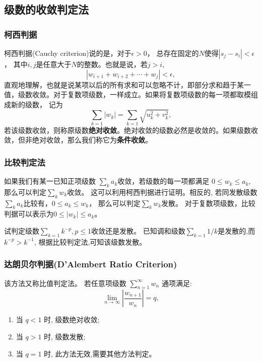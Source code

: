 \subsection{级数的收敛判定法}

\subsubsection{柯西判据}
柯西判据(Cauchy criterion)说的是，对于$\epsilon>0$， 总存在固定的$N$使得$|s_j - s_i|< \epsilon$， 其中$i,j$是任意大于$N$的整数。也就是说，若$j>i$,
\begin{equation}
    | w_{i+1} + w_{i+2} + \cdots + w_{j} | < \epsilon ,
\end{equation}
直观地理解，也就是说某项以后的所有求和可以忽略不计，即部分求和趋于某一值，级数收敛。对于复数项级数，一样成立。如果将复数项级数的每一项都取模组成新的级数，
记为
\begin{equation}
    \sum_{k=1} |w_k| = \sum_{k=1}\sqrt { u_k^2 + v_k^2},
\end{equation}
若该级数收敛，则称原级数\textbf{绝对收敛}。绝对收敛的级数必然是收敛的。如果级数收敛，但非绝对收敛，那么我们称它为\textbf{条件收敛}。
\subsubsection{比较判定法}
如果我们有某一已知正项级数 $\sum_k a_k$收敛，若级数的每一项都满足 $0 \leq w_k \leq a_k$, 那么可以判定$\sum_k w_k$收敛。
这可以利用柯西判据进行证明。相反的, 若同发散级数$\sum_{k} a_k$比较有，$0 \leq a_k  \leq w_k$， 那么可以判定$\sum_k w_k$发散。
对于复数项级数，比较判据可以表示为$0 \leq |w_k| \leq a_k$。

\begin{examplebox}{试判定级数$\sum_{k=1} k^{-p}, p\leq 1$收敛还是发散。}
    已知调和级数$\sum_{k=1}1/k$是发散的,而 $k^{-p} > k^{-1}$, 根据比较判定法,可知该级数发散。
\end{examplebox}

\subsubsection{达朗贝尔判据(D'Alembert Ratio Criterion)}
该方法又称比值判定法。
若任意项级数 $\sum_{n=1}^{\infty} w_n$ 通项满足:
$$
\lim _{n \to \infty}\left|\frac{w_{n+1}}{w_n}\right|=q ,
$$
\begin{enumerate}
    \item 当 $q<1$ 时, 级数绝对收敛;
    \item 当 $q>1$ 时, 级数发散;
    \item 当 $q=1$ 时, 此方法无效,需要其他方法判定。
\end{enumerate}

